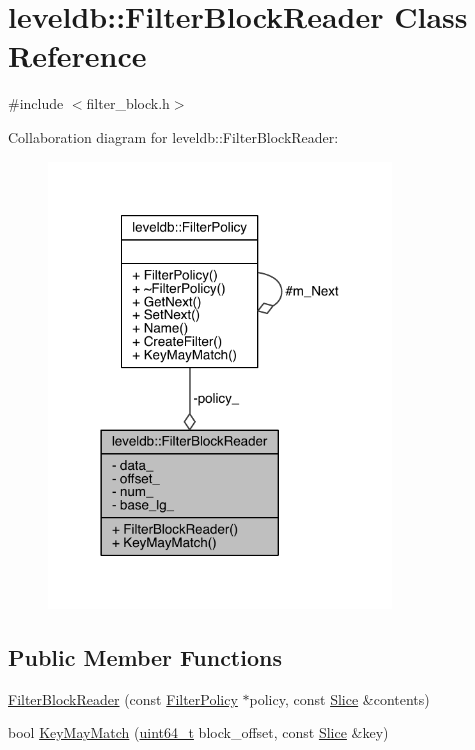 \hypertarget{classleveldb_1_1_filter_block_reader}{}\section{leveldb\+:\+:Filter\+Block\+Reader Class Reference}
\label{classleveldb_1_1_filter_block_reader}


{\ttfamily \#include $<$filter\+\_\+block.\+h$>$}



Collaboration diagram for leveldb\+:\+:Filter\+Block\+Reader\+:\nopagebreak
\begin{figure}[H]
\begin{center}
\leavevmode
\includegraphics[width=258pt]{classleveldb_1_1_filter_block_reader__coll__graph}
\end{center}
\end{figure}
\subsection*{Public Member Functions}
\begin{DoxyCompactItemize}
\item 
\hyperlink{classleveldb_1_1_filter_block_reader_a02e9203af5314959ad99057f0020c406}{Filter\+Block\+Reader} (const \hyperlink{classleveldb_1_1_filter_policy}{Filter\+Policy} $\ast$policy, const \hyperlink{classleveldb_1_1_slice}{Slice} \&contents)
\item 
bool \hyperlink{classleveldb_1_1_filter_block_reader_a2c1c0cd8311b99fd92d3548b7aa240d0}{Key\+May\+Match} (\hyperlink{stdint_8h_aaa5d1cd013383c889537491c3cfd9aad}{uint64\+\_\+t} block\+\_\+offset, const \hyperlink{classleveldb_1_1_slice}{Slice} \&key)
\end{DoxyCompactItemize}
